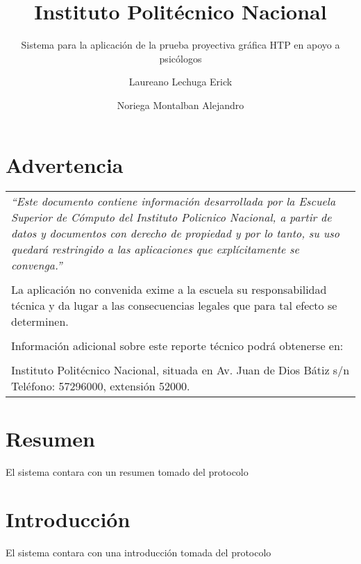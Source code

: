 \documentclass[oneside,10pt]{book}
\title{Instituto Politécnico Nacional}
\subtitle{Sistema para la aplicación de la prueba proyectiva gráfica HTP en apoyo a psicólogos}
\author{Laureano Lechuga Erick  \and  \color{authorColor} Noriega Montalban Alejandro}
\begin{document}
\maketitle
\thispagestyle{empty}
\tableofcontents

\chapter*{Advertencia}

\begin{center}
\begin{tabular}{ ||m{35em}|| } 
 \hline
 \hline
 \textit{``Este documento contiene información desarrollada por la Escuela Superior de Cómputo del Instituto Policnico Nacional, a partir de datos y documentos con derecho de propiedad y por lo tanto, su uso quedará restringido a las aplicaciones que explícitamente se convenga.''}\\
 \\
 La aplicación no convenida exime a la escuela su responsabilidad técnica y da lugar a las consecuencias legales que para tal efecto se determinen.\\
 \\
 Información adicional sobre este reporte técnico podrá obtenerse en:\\
 \\
 Instituto Politécnico Nacional, situada en Av. Juan de Dios Bátiz s/n Teléfono: 57296000, extensión 52000.\\ 
 \hline
 \hline
\end{tabular}
\end{center}

 
\chapter*{Resumen}
El sistema contara con un resumen tomado del protocolo

\chapter*{Introducción}
El sistema contara con una introducción tomada del protocolo

\end{document}
